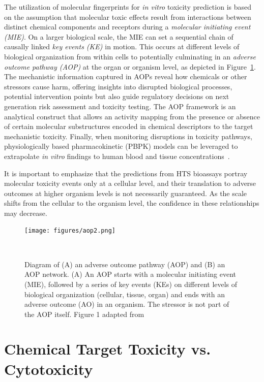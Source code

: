 The utilization of molecular fingerprints for \emph{in vitro} toxicity prediction is based on the assumption that molecular toxic effects result from interactions between distinct chemical components and receptors during a \emph{molecular initiating event (MIE)}. On a larger biological scale, the MIE can set a sequential chain of causally linked \emph{key events (KE)} in motion. This occurs at different levels of biological organization from within cells to potentially culminating in an \emph{adverse outcome pathway (AOP)} at the organ or organism level, as depicted in Figure~\ref{fig:aop}. The mechanistic information captured in AOPs reveal how chemicals or other stressors cause harm, offering insights into disrupted biological processes, potential intervention points but also guide regulatory decisions on next generation risk assessment and toxicity testing. The AOP framework is an analytical construct that allows an activity mapping from the presence or absence of certain molecular substructures encoded in chemical descriptors to the target mechanistic toxicity. Finally, when monitoring disruptions in toxicity pathways, physiologically based pharmacokinetic (PBPK) models can be leveraged to extrapolate \emph{in vitro} findings to human blood and tissue concentrations~\cite{bell2018}.

It is important to emphasize that the predictions from HTS bioassays portray molecular toxicity events only at a cellular level, and their translation to adverse outcomes at higher organism levels is not necessarily guaranteed. As the scale shifts from the cellular to the organism level, the confidence in these relationships may decrease.

\begin{figure}[htbp]  %
    \centering
    \texttt{[image: figures/aop2.png]}  
    \caption{Diagram of (A) an adverse outcome pathway (AOP) and (B) an AOP network. (A) An AOP starts with a molecular initiating event (MIE), followed by a series of key events (KEs) on different levels of biological organization (cellular, tissue, organ) and ends with an adverse outcome (AO) in an organism. The stressor is not part of the AOP itself. Figure 1 adapted from~\cite{nymark2021}}
~\label{fig:aop} 
\end{figure}


\section{Chemical Target Toxicity vs. Cytotoxicity}\label{sec:cytotoxicity}

